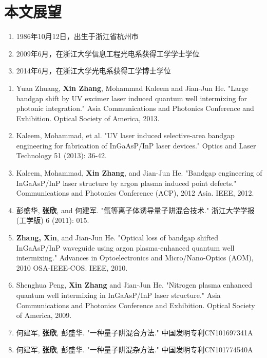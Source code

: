 \documentclass[oneside]{ZJUthesis}
\begin{document}
\section{本文展望}

\ZJUbackmatter



\begin{resume}
\begin{enumerate}
\item{1986年10月12日，出生于浙江省杭州市}
\item{2009年6月，在浙江大学信息工程光电系获得工学学士学位}
\item{2014年6月，在浙江大学光电系获得工学博士学位}
\end{enumerate}
\end{resume}

\begin{publications}
\begin{enumerate}
\item{Yuan Zhuang, \textbf{Xin Zhang}, Mohammad Kaleem and Jian-Jun He. "Large bandgap shift by UV excimer laser induced quantum well intermixing for photonic integration." Asia Communications and Photonics Conference and Exhibition. Optical Society of America, 2013.}
\item{Kaleem, Mohammad, et al. "UV laser induced selective-area bandgap engineering for fabrication of InGaAsP/InP laser devices." Optics and Laser Technology 51 (2013): 36-42.}
\item{Kaleem, Mohammad, \textbf{Xin Zhang}, and Jian-Jun He. "Bandgap engineering of InGaAsP/InP laser structure by argon plasma induced point defects." Communications and Photonics Conference (ACP), 2012 Asia. IEEE, 2012.}
\item{彭盛华, \textbf{张欣}, and 何建军. "氩等离子体诱导量子阱混合技术." 浙江大学学报 (工学版) 6 (2011): 015.}
\item{\textbf{Zhang, Xin}, and Jian-Jun He. "Optical loss of bandgap shifted InGaAsP/InP waveguide using argon plasma-enhanced quantum well intermixing." Advances in Optoelectronics and Micro/Nano-Optics (AOM), 2010 OSA-IEEE-COS. IEEE, 2010.}
\item{Shenghua Peng, \textbf{Xin Zhang} and Jian-Jun He. "Nitrogen plasma enhanced quantum well intermixing in InGaAsP/InP laser structure." Asia Communications and Photonics Conference and Exhibition. Optical Society of America, 2009.}
\item{何建军, \textbf{张欣}, 彭盛华. "一种量子阱混合方法." 中国发明专利CN101697341A}
\item{何建军, \textbf{张欣}, 彭盛华. "一种量子阱混杂方法." 中国发明专利CN101774540A}
\end{enumerate}
\end{publications}
\end{document}
